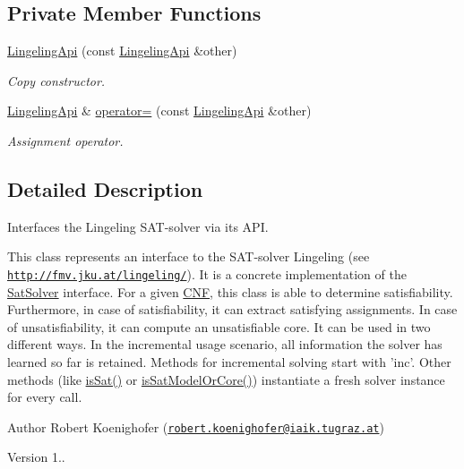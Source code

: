 \subsection*{Private Member Functions}
\begin{DoxyCompactItemize}
\item 
\hyperlink{classLingelingApi_ac2716f603b9029e3083a1039eb1ed0bd}{Lingeling\-Api} (const \hyperlink{classLingelingApi}{Lingeling\-Api} \&other)
\begin{DoxyCompactList}\small\item\em Copy constructor. \end{DoxyCompactList}\item 
\hyperlink{classLingelingApi}{Lingeling\-Api} \& \hyperlink{classLingelingApi_a1963aa6729bd9203863010b9bbdb1683}{operator=} (const \hyperlink{classLingelingApi}{Lingeling\-Api} \&other)
\begin{DoxyCompactList}\small\item\em Assignment operator. \end{DoxyCompactList}\end{DoxyCompactItemize}


\subsection{Detailed Description}
Interfaces the Lingeling S\-A\-T-\/solver via its A\-P\-I. 

This class represents an interface to the S\-A\-T-\/solver Lingeling (see \href{http://fmv.jku.at/lingeling/}{\tt http\-://fmv.\-jku.\-at/lingeling/}). It is a concrete implementation of the \hyperlink{classSatSolver}{Sat\-Solver} interface. For a given \hyperlink{classCNF}{C\-N\-F}, this class is able to determine satisfiability. Furthermore, in case of satisfiability, it can extract satisfying assignments. In case of unsatisfiability, it can compute an unsatisfiable core. It can be used in two different ways. In the incremental usage scenario, all information the solver has learned so far is retained. Methods for incremental solving start with 'inc'. Other methods (like \hyperlink{classLingelingApi_a38358f64ded244e2e3d843d0565f0177}{is\-Sat()} or \hyperlink{classLingelingApi_a8f147b59f0ebabc35a20d295f28d499f}{is\-Sat\-Model\-Or\-Core()}) instantiate a fresh solver instance for every call.

\begin{DoxyAuthor}{Author}
Robert Koenighofer (\href{mailto:robert.koenighofer@iaik.tugraz.at}{\tt robert.\-koenighofer@iaik.\-tugraz.\-at}) 
\end{DoxyAuthor}
\begin{DoxyVersion}{Version}
1.. 
\end{DoxyVersion}


